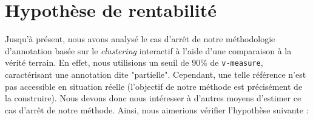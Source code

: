 \section{Hypothèse de rentabilité}
\label{section:4.5-HYPOTHESE-RENTABILITE}

	Jusqu'à présent, nous avons analysé le cas d'arrêt de notre méthodologie d'annotation basée sur le \textit{clustering} interactif à l'aide d'une comparaison à la vérité terrain.
	En effet, nous utilisions un seuil de $90$\% de \texttt{v-measure}, caractérisant une annotation dite "partielle".
	Cependant, une telle référence n'est pas accessible en situation réelle (l'objectif de notre méthode est précisément de la construire).
	Nous devons donc nous intéresser à d'autres moyens d'estimer ce cas d'arrêt de notre méthode.
	Ainsi, nous aimerions vérifier l'hypothèse suivante :
	
